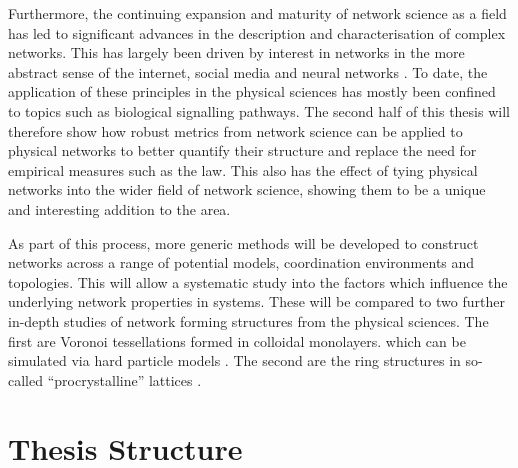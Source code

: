 Furthermore, the continuing expansion and maturity of network science as a field has led to significant advances in the description and characterisation of complex networks.
This has largely been driven by interest in networks in the more abstract sense of the internet, social media and neural networks \cite{Strogatz2001,Boccaletti2006,Barabasi2012}.
To date, the application of these principles in the physical sciences has mostly been confined to topics such as biological signalling pathways.
The second half of this thesis will therefore show how robust metrics from network science can be applied to physical \td{} networks to better quantify their structure and replace the need for empirical measures such as the \aw{} law.
This also has the effect of tying physical \td{} networks into the wider field of network science, showing them to be a unique and interesting addition to the area.

As part of this process, more generic methods will be developed to construct \td{} networks across a range of potential models, coordination environments and topologies.
This will allow a systematic study into the factors which influence the underlying network properties in \td{} systems.
These will be compared to two further in\--depth studies of network forming structures from the physical sciences.
The first are Voronoi tessellations formed in colloidal monolayers.
which can be simulated via hard particle models \cite{Thorneywork2017}.
The second are the ring structures in so\--called ``procrystalline'' lattices \cite{Overy2016}.


\section{Thesis Structure}

 
